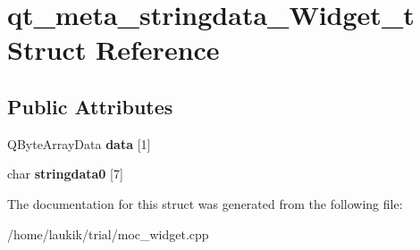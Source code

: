 \hypertarget{structqt__meta__stringdata__Widget__t}{}\section{qt\+\_\+meta\+\_\+stringdata\+\_\+\+Widget\+\_\+t Struct Reference}
\label{structqt__meta__stringdata__Widget__t}
\subsection*{Public Attributes}
\begin{DoxyCompactItemize}
\item 
\mbox{\label{structqt__meta__stringdata__Widget__t_a9fe3de556b708897fb7eb999f1efbfcb}} 
Q\+Byte\+Array\+Data {\bfseries data} \mbox{[}1\mbox{]}
\item 
\mbox{\label{structqt__meta__stringdata__Widget__t_abfd6a2b9daf76d6315586d12e8b7ec36}} 
char {\bfseries stringdata0} \mbox{[}7\mbox{]}
\end{DoxyCompactItemize}


The documentation for this struct was generated from the following file\+:\begin{DoxyCompactItemize}
\item 
/home/laukik/trial/moc\+\_\+widget.\+cpp\end{DoxyCompactItemize}
